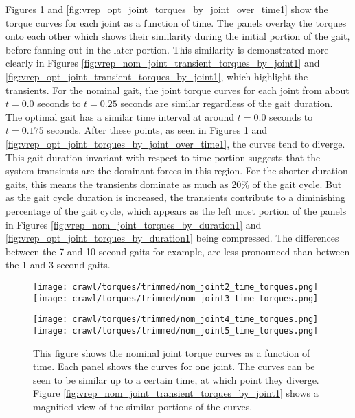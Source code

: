 Figures \ref{fig:vrep_nom_joint_torques_by_joint_over_time1} and 
\ref{fig:vrep_opt_joint_torques_by_joint_over_time1} show the torque curves for each joint as a function of time.
The panels overlay the torques onto each other
which shows their similarity during the initial portion of the gait, before fanning out
in the later portion.
This similarity is demonstrated more clearly in Figures \ref{fig:vrep_nom_joint_transient_torques_by_joint1}
and \ref{fig:vrep_opt_joint_transient_torques_by_joint1}, which highlight the transients.
For the nominal gait, the joint torque curves for each joint from about $t = 0.0$ seconds to $t = 0.25$ seconds
are similar regardless of the gait duration. The optimal gait has a similar time interval
at around $t = 0.0$ seconds to $t = 0.175$ seconds. After these points, as seen in Figures 
\ref{fig:vrep_nom_joint_torques_by_joint_over_time1} and 
\ref{fig:vrep_opt_joint_torques_by_joint_over_time1}, the curves tend to diverge.
This gait-duration-invariant-with-respect-to-time portion suggests that the system transients are the dominant
forces in this region. For the shorter duration gaits, this means the transients dominate as much as
20\% of the gait cycle. But as the gait cycle duration is increased, the transients
contribute to a diminishing percentage of the gait cycle, which appears as the left most
portion of the panels in Figures \ref{fig:vrep_nom_joint_torques_by_duration1} and 
\ref{fig:vrep_opt_joint_torques_by_duration1} being compressed. 
The differences between the 7 and 10 second gaits for example,
are less pronounced than between the 1 and 3 second gaits.

\begin{figure}
  \centerline{
    \texttt{[image: crawl/torques/trimmed/nom\_joint2\_time\_torques.png]}
    \texttt{[image: crawl/torques/trimmed/nom\_joint3\_time\_torques.png]}
  }
  \centerline{
    \texttt{[image: crawl/torques/trimmed/nom\_joint4\_time\_torques.png]}
    \texttt{[image: crawl/torques/trimmed/nom\_joint5\_time\_torques.png]}
  }
  \caption{This figure shows the nominal joint torque curves as a function of time.
           Each panel shows the curves for one joint. The curves can be seen to be similar
           up to a certain time, at which point they diverge. 
           Figure \ref{fig:vrep_nom_joint_transient_torques_by_joint1} shows a magnified
           view of the similar portions of the curves.}
  \label{fig:vrep_nom_joint_torques_by_joint_over_time1}
\end{figure}

